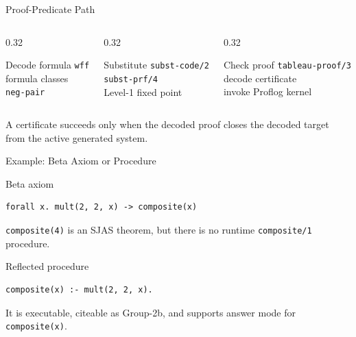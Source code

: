 \documentclass[aspectratio=169]{beamer}
\newcommand{\code}[1]{\texttt{#1}}
\begin{document}
\begin{frame}{Proof-Predicate Path}
  \begin{columns}[T,onlytextwidth]
    \begin{column}{0.32\textwidth}
      \begin{block}{Decode formula}
        \small
        \code{wff}\\
        formula classes\\
        \code{neg-pair}
      \end{block}
    \end{column}
    \begin{column}{0.32\textwidth}
      \begin{block}{Substitute}
        \small
        \code{subst-code/2}\\
        \code{subst-prf/4}\\
        Level-1 fixed point
      \end{block}
    \end{column}
    \begin{column}{0.32\textwidth}
      \begin{exampleblock}{Check proof}
        \small
        \code{tableau-proof/3}\\
        decode certificate\\
        invoke Proflog kernel
      \end{exampleblock}
    \end{column}
  \end{columns}

  \vspace{0.9em}
  A certificate succeeds only when the decoded proof closes the decoded target
  from the active generated system.
\end{frame}

\begin{frame}[fragile]{Example: Beta Axiom or Procedure}
  \begin{block}{Beta axiom}
\begin{verbatim}
forall x. mult(2, 2, x) -> composite(x)
\end{verbatim}
    \small
    \code{composite(4)} is an SJAS theorem, but there is no runtime
    \code{composite/1} procedure.
  \end{block}

  \begin{exampleblock}{Reflected procedure}
\begin{verbatim}
composite(x) :- mult(2, 2, x).
\end{verbatim}
    \small
    It is executable, citeable as Group-2b, and supports answer mode for
    \code{composite(x)}.
  \end{exampleblock}
\end{frame}
\end{document}
